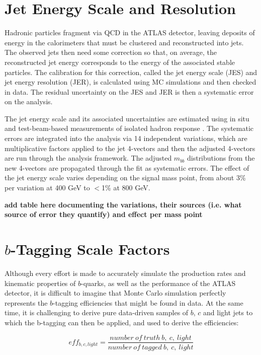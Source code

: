 \section{Jet Energy Scale and Resolution}
\label{sec:jes}
Hadronic particles fragment via QCD in the ATLAS detector, leaving deposits of 
energy in the calorimeters that must be clustered and reconstructed into jets.  The
observed jets then need some correction so that, on average, the reconstructed
jet energy corresponds to the energy of the associated stable particles.  The
calibration for this correction, called the jet energy scale (JES) and jet
energy resolution (JER), is calculated using MC simulations and then checked
in data.  The residual uncertainty on the JES and JER is then a systematic 
error on the analysis. 

The jet energy scale and its associated uncertainties are estimated using
in situ and test-beam-based measurements of isolated hadron response \cite{jes}.  The systematic
errors are integrated into the analysis via 14 independent variations, which are multiplicative factors applied to the jet
4-vectors and then the adjusted 4-vectors are run through the analysis framework.
The adjusted $m_{bb}$ distributions from the new 4-vectors are propagated through the fit as systematic
errors.  The effect of the jet energy scale varies depending on the signal mass
point, from about 3\% per variation at 400 GeV to $<$1\% at 800 GeV.

\textbf{add table here documenting the variations, their sources (i.e. what 
source of error they quantify) and effect per mass point}
%

\section{$b$-Tagging Scale Factors}
\label{sec:SF}
Although every effort is made to accurately simulate the production rates and
kinematic properties of $b$-quarks, as well as the performance of the ATLAS
detector, it is difficult to imagine that Monte Carlo simulation perfectly represents
the $b$-tagging efficiencies that might be found in data.  At the same time, it
is challenging to derive pure data-driven samples of $b$, $c$ and light jets to which
the b-tagging can then be applied, and used to derive the efficiencies:

    \begin{equation}
        eff_{b,c,light}=\frac{number\ of\ truth\ b,\ c,\ light}{number\ of\ tagged\ b,\ c,\ light}
    \end{equation}

